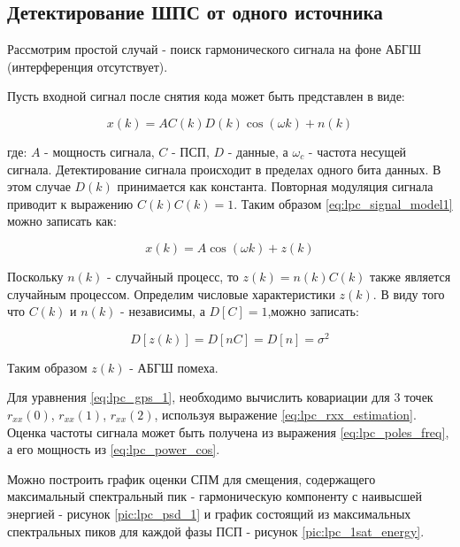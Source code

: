 \subsection{Детектирование ШПС от одного источника}
Рассмотрим простой случай - поиск гармонического сигнала на фоне АБГШ (интерференция отсутствует).

Пусть входной сигнал после снятия кода может быть представлен в виде:
\begin{center}
\begin{equation}
	\label{eq:lpc_signal_model1}
	x(k) = AC(k)D(k)\cos(\omega k) + n(k)
\end{equation}
\end{center}
где: ${A}$ - мощность сигнала, ${C}$ - ПСП, ${D}$ - данные, а ${\omega_{c}}$ - частота несущей сигнала.
Детектирование сигнала происходит в пределах одного бита данных. В этом случае ${D(k)}$
принимается как константа. Повторная модуляция сигнала приводит к выражению ${C(k)C(k)=1}$.
Таким образом \ref{eq:lpc_signal_model1} можно записать как:
\begin{center}
\begin{equation}
	\label{eq:lpc_signal_model2}
	x(k)= A \cos{(\omega k)} + z(k)
\end{equation}
\end{center}

Поскольку ${n(k)}$ - случайный процесс, то ${z(k) = n(k)C(k)}$ также является
случайным процессом. Определим числовые характеристики ${z(k)}$.
В виду того что ${C(k)}$ и ${n(k)}$ - независимы, а ${D[C] = 1}$,можно записать:

\begin{center}
\begin{equation}
	D[z(k)] = D[nC] = D[n] = \sigma ^2
\end{equation}
\end{center}
Таким образом ${z(k)}$ - АБГШ помеха.

Для уравнения \ref{eq:lpc_gps_1}, необходимо вычислить ковариации для 3 точек
${r_{xx}(0)}$, ${r_{xx}(1)}$, ${r_{xx}(2)}$, используя выражение \ref{eq:lpc_rxx_estimation}.
Оценка частоты сигнала может быть получена из выражения \ref{eq:lpc_poles_freq}, а его
мощность из \ref{eq:lpc_power_cos}.

Можно построить график оценки СПМ для смещения,
содержащего максимальный спектральный пик - гармоническую компоненту
с наивысшей энергией - рисунок \ref{pic:lpc_psd_1} и график состоящий из максимальных спектральных пиков для каждой фазы
ПСП - рисунок \ref{pic:lpc_1sat_energy}.

